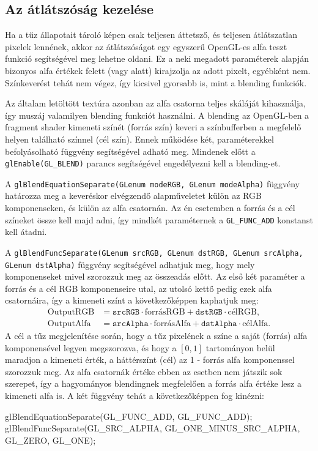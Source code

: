 \subsection{Az átlátszóság kezelése}

Ha a tűz állapotait tároló képen csak teljesen áttetsző, és teljesen átlátszatlan pixelek lennének, akkor az átlátszóságot egy egyszerű OpenGL-es alfa teszt funkció segítségével meg lehetne oldani. Ez a neki megadott paraméterek alapján bizonyos alfa értékek felett (vagy alatt) kirajzolja az adott pixelt, egyébként nem. Színkeverést tehát nem végez, így kicsivel gyorsabb is, mint a blending funkciók.

Az általam letöltött textúra azonban az alfa csatorna teljes skáláját kihasználja, így muszáj valamilyen blending funkciót használni. A blending az OpenGL-ben a fragment shader kimeneti színét (forrás szín) keveri a színbufferben a megfelelő helyen található színnel (cél szín). Ennek működése két, paraméterekkel befolyásolható függvény segítségével adható meg. Mindenek előtt a \texttt{glEnable(GL\_BLEND)} parancs segítségével engedélyezni kell a blending-et.

A \texttt{glBlendEquationSeparate(GLenum modeRGB, GLenum modeAlpha)} függvény határozza meg a keveréskor elvégzendő alapműveletet külön az RGB komponenseken, és külön az alfa csatornán. Az én esetemben a forrás és a cél színeket össze kell majd adni, így mindkét paraméternek a \texttt{GL\_FUNC\_ADD} konstanst kell átadni.

A \texttt{glBlendFuncSeparate(GLenum srcRGB, GLenum dstRGB, GLenum srcAlpha,\\ GLenum dstAlpha)} függvény segítségével adhatjuk meg, hogy mely komponenseket mivel szorozzuk meg az összeadás előtt. Az első két paraméter a forrás és a cél RGB komponenseire utal, az utolsó kettő pedig ezek alfa csatornáira, így a kimeneti színt a következőképpen kaphatjuk meg: 
\begin{align*}
\text{OutputRGB} &= \texttt{srcRGB} \cdot \text{forrásRGB} + \texttt{dstRGB} \cdot \text{célRGB}, \\
\text{OutputAlfa} &= \texttt{srcAlpha} \cdot \text{forrásAlfa} + \texttt{dstAlpha} \cdot \text{célAlfa}.
\end{align*}
A cél a tűz megjelenítése során, hogy a tűz pixelének a színe a saját (forrás) alfa komponensével legyen megszorozva, és hogy a $[0, 1]$ tartományon belül maradjon a kimeneti érték, a háttérszínt (cél) az 1 - forrás alfa komponenssel szorozzuk meg. Az alfa csatornák értéke ebben az esetben nem játszik sok szerepet, így a hagyományos blendingnek megfelelően a forrás alfa értéke lesz a kimeneti alfa is. A két függvény tehát a következőképpen fog kinézni:
\begin{cpp}
glBlendEquationSeparate(GL_FUNC_ADD, GL_FUNC_ADD);
glBlendFuncSeparate(GL_SRC_ALPHA, GL_ONE_MINUS_SRC_ALPHA,
	 GL_ZERO, GL_ONE);
\end{cpp}

